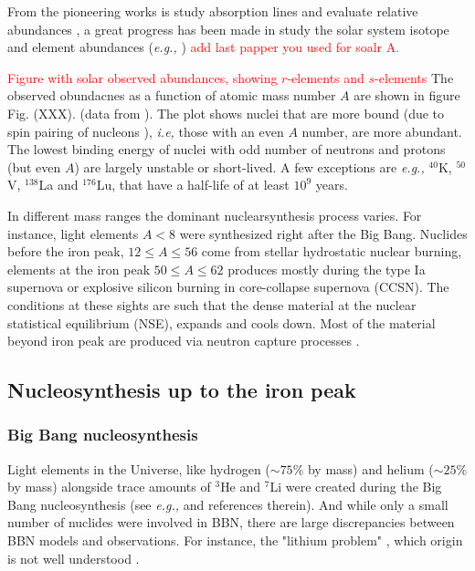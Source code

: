 \documentclass[11pt,a4paper,headinclude=true,DIV=14,BCOR=8mm,chapterprefix,listof=totoc,twoside,openright,abstracton]{scrbook}
\begin{document}
From the pioneering works is study absorption lines and evaluate relative abundances \cite{Suess:1956}, a great progress has been made in study the solar system isotope and element abundances (\textit{e.g.,} \cite{Cameron:1973,Anders:1989,Grevesse:1998,Lodders:2003}) \textcolor{red}{add last papper you used for soalr A.}

\begin{sidenote}
    \textcolor{red}{Figure with solar observed abundances, showing $r$-elements and $s$-elements}
    The observed obundacnes as a function of atomic mass number $A$ are shown in figure Fig. (XXX). (data from \cite{Lodders:2003}). The plot shows nuclei that are more bound (due to spin pairing of nucleons \cite{Moller:1993ed}), \textit{i.e,} those with an even $A$ number, are more abundant. The lowest binding energy of nuclei with odd number of neutrons and protons (but even $A$) are largely unstable or short-lived. A few exceptions are \textit{e.g.,} $^{40}$K, $^{50}$V, $^{138}$La and $^{176}$Lu, that have a half-life of at least $10^{9}$ years.
\end{sidenote}

In different mass ranges the dominant nuclearsynthesis process varies. For instance, light elements $A<8$ were synthesized right after the Big Bang. Nuclides before the iron peak, $12\leq A\leq 56$ come from stellar hydrostatic nuclear burning, elements at the iron peak $50\leq A \leq 62$ produces mostly during the type Ia supernova or explosive silicon burning in core-collapse supernova (CCSN). The conditions at these sights are such that the dense material at the nuclear statistical equilibrium (NSE), expands and cools down. Most of the material beyond iron peak are produced via neutron capture processes \cite{Burbidge:1957}.


\subsection{Nucleosynthesis up to the iron peak}

\subsubsection{Big Bang nucleosynthesis}

Light elements in the Universe, like hydrogen ($\sim 75\%$ by mass) and helium ($\sim 25\%$ by mass) alongside trace amounts of $^{3}$He and $^{7}$Li were created during the Big Bang nucleosynthesis (see \textit{e.g.,} \cite{Tytler:2000qf} and references therein). And while only a small number of nuclides were involved in BBN, there are large discrepancies between BBN models and observations. For instance, the "lithium problem" \cite{Coc:2013eha}, which origin is not well understood \cite{Fields:2011zzb}.
\end{document}
